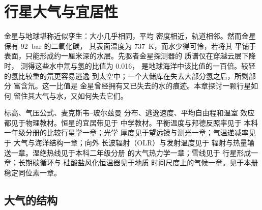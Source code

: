 \chapter{行星大气与宜居性}\label{ch:b3:planetary-atmospheres}

金星与地球堪称近似孪生：大小几乎相同，平均
密度相近，轨道相邻。然而金星保有 \qty{92}{bar} 的二氧化碳，
其表面温度为 \qty{737}{K}，而水少得可怜，若将其
平铺于表面，只能形成约一厘米深的水层。先驱者金星探测器的
质谱仪在穿越云层下降时，
测得这些水中氘与氢的比值为 \num{0.016}，
是地球海洋中该比值的一百倍。较轻的氢比较重的氘更容易逃逸
到太空中；一个大储库在失去大部分氢之后，所剩部分
富含氘。这一比值是
金星曾经拥有又已失去的水的痕迹。本章探讨一颗行星如何
留住其大气与水，又如何失去它们。

\begin{recall}
标高、气压公式、麦克斯韦–玻尔兹曼
分布、逃逸速度、平均自由程和温室
效应都见于物理教材。恒星的宜居带见于
中学教材。平衡温度与邦德反照率见于
本科一年级分册的比较行星学一章；光学
厚度见于望远镜与测光一章；气温递减率见于
大气与海洋结构一章；向外
长波辐射（OLR）与发射温度见于
辐射与热量输送一章。湿绝热线见于本科二年级分册
的大气热力学一章；雪线见于
行星形成一章；长期碳循环与
硅酸盐风化恒温器见于地质
时间尺度上的气候一章。见于本册
稳定同位素一章。
\end{recall}

\section{大气的结构}\label{sec:b3:planetary-atmospheres:structure}

